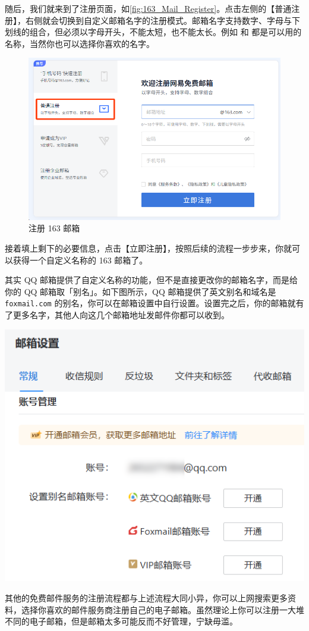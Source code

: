 随后，我们就来到了注册页面，如\autoref{fig:163_Mail_Register}。点击左侧的【普通注册】，右侧就会切换到自定义邮箱名字的注册模式。邮箱名字支持数字、字母与下划线的组合，但必须以字母开头，不能太短，也不能太长。例如  和  都是可以用的名称，当然你也可以选择你喜欢的名字。

\begin{figure}[htb!]
  \centering
  \includegraphics[width=.55\textwidth]{assets/software/163_Mail_Register.png}
  \caption{注册 163 邮箱}
  \label{fig:163_Mail_Register}
\end{figure}

接着填上剩下的必要信息，点击【立即注册】，按照后续的流程一步步来，你就可以获得一个自定义名称的 163 邮箱了。

\begin{note}
  其实 QQ 邮箱提供了自定义名称的功能，但不是直接更改你的邮箱名字，而是给你的 QQ 邮箱取「别名」。如下图所示，QQ 邮箱提供了英文别名和域名是 \texttt{foxmail.com} 的别名，你可以在邮箱设置中自行设置。设置完之后，你的邮箱就有了更多名字，其他人向这几个邮箱地址发邮件你都可以收到。
  \begin{center}
    \includegraphics[width=.5\textwidth]{assets/software/QQ_Mail_Alias.png}
    \label{fig:QQ_Mail_Alias}
  \end{center}
\end{note}

其他的免费邮件服务的注册流程都与上述流程大同小异，你可以上网搜索更多资料，选择你喜欢的邮件服务商注册自己的电子邮箱。虽然理论上你可以注册一大堆不同的电子邮箱，但是邮箱太多可能反而不好管理，宁缺毋滥。

